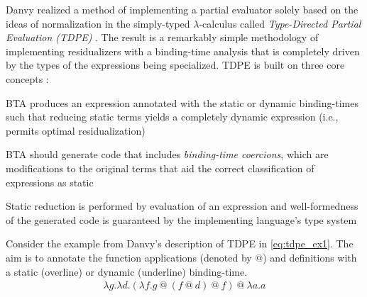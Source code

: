 \documentclass[a4paper,12pt,twoside,openright]{report}
\newenvironment{tight_enumerate}{
\begin{enumerate}
  \setlength{\itemsep}{0pt}
  \setlength{\parskip}{0pt}
}{\end{enumerate}}
\theoremstyle{definition}
\begin{document}
Danvy realized a method of implementing a partial evaluator solely based on the ideas of normalization in the simply-typed $\lambda$-calculus called \textit{Type-Directed Partial Evaluation (TDPE)} \cite{danvy1999type}. The result is a remarkably simple methodology of implementing residualizers with a binding-time analysis that is completely driven by the types of the expressions being specialized. TDPE is built on three core concepts \cite{danvy1997online,grobauer2001second}:
\begin{tight_enumerate}
    \item BTA produces an expression annotated with the static or dynamic binding-times such that reducing static terms yields a completely dynamic expression (i.e., permits optimal residualization)
    \item BTA should generate code that includes \textit{binding-time coercions}, which are modifications to the original terms that aid the correct classification of expressions as static
    \item Static reduction is performed by evaluation of an expression and well-formedness of the generated code is guaranteed by the implementing language's type system
\end{tight_enumerate}

Consider the example from Danvy's description of TDPE \cite{danvy1999type} in \eqref{eq:tdpe_ex1}. The aim is to annotate the function applications (denoted by $@$) and definitions with a static (overline) or dynamic (underline) binding-time.
\begin{align}
    \lambda g.\lambda d.(\lambda f.g \:@ \: (f \: @ \: d)\: @ \:f) \: @ \: \lambda a.a \label{eq:tdpe_ex1}
\end{align}
\end{document}
